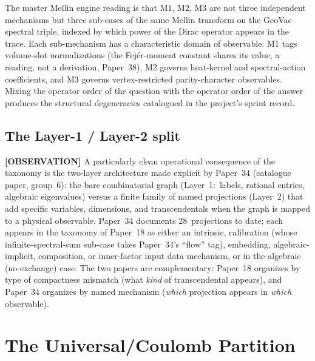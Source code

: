 \documentclass[aps,pra,twocolumn,superscriptaddress,longbibliography]{revtex4-2}
\begin{document}
The master Mellin engine reading is that M1, M2, M3 are not three
independent mechanisms but three sub-cases of the same Mellin
transform on the GeoVac spectral triple, indexed by which power of the
Dirac operator appears in the trace.  Each sub-mechanism has a
characteristic domain of observable: M1 tags volume-slot
normalizations (the Fej\'er-moment constant shares its value, a reading, not a
derivation, Paper~38), M2 governs
heat-kernel and spectral-action coefficients, and M3 governs
vertex-restricted parity-character observables.  Mixing the operator
order of the question with the operator order of the answer produces
the structural degeneracies catalogued in the project's sprint
record.

\subsection*{The Layer-1 / Layer-2 split}

\textbf{[OBSERVATION]} A particularly clean operational consequence of the taxonomy is the
two-layer architecture made explicit by Paper~34 (catalogue paper,
group~6): the bare combinatorial graph (Layer~1:\ labels,
rational entries, algebraic eigenvalues) versus a finite family of named projections
(Layer~2) that add specific variables, dimensions, and transcendentals
when the graph is mapped to a physical observable.  Paper~34
documents 28~projections to date; each appears in the taxonomy of
Paper~18 as either an intrinsic, calibration (whose
infinite-spectral-sum sub-case takes Paper~34's ``flow'' tag), embedding,
algebraic-implicit, composition, or inner-factor input data
mechanism, or in the algebraic (no-exchange) case.  The two papers are complementary: Paper~18 organizes by
type of compactness mismatch (what \emph{kind} of transcendental
appears), and Paper~34 organizes by named mechanism (\emph{which}
projection appears in \emph{which} observable).

\section{The Universal/Coulomb Partition}
\label{sec:partition}
\end{document}
